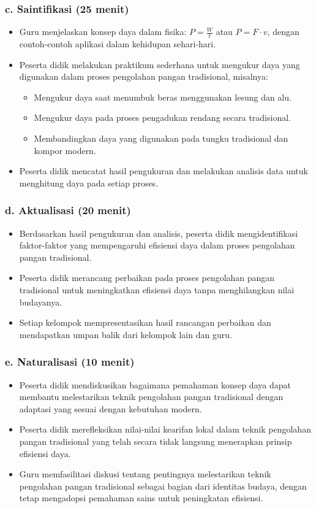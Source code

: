 \documentclass[12pt,a4paper]{article}
\begin{document}
\subsubsection*{c. Saintifikasi (25 menit)}
\begin{itemize}[leftmargin=*]
    \item Guru menjelaskan konsep daya dalam fisika: $P = \frac{W}{t}$ atau $P = F \cdot v$, dengan contoh-contoh aplikasi dalam kehidupan sehari-hari.
    \item Peserta didik melakukan praktikum sederhana untuk mengukur daya yang digunakan dalam proses pengolahan pangan tradisional, misalnya:
    \begin{itemize}
        \item Mengukur daya saat menumbuk beras menggunakan lesung dan alu.
        \item Mengukur daya pada proses pengadukan rendang secara tradisional.
        \item Membandingkan daya yang digunakan pada tungku tradisional dan kompor modern.
    \end{itemize}
    \item Peserta didik mencatat hasil pengukuran dan melakukan analisis data untuk menghitung daya pada setiap proses.
\end{itemize}

\subsubsection*{d. Aktualisasi (20 menit)}
\begin{itemize}[leftmargin=*]
    \item Berdasarkan hasil pengukuran dan analisis, peserta didik mengidentifikasi faktor-faktor yang mempengaruhi efisiensi daya dalam proses pengolahan pangan tradisional.
    \item Peserta didik merancang perbaikan pada proses pengolahan pangan tradisional untuk meningkatkan efisiensi daya tanpa menghilangkan nilai budayanya.
    \item Setiap kelompok mempresentasikan hasil rancangan perbaikan dan mendapatkan umpan balik dari kelompok lain dan guru.
\end{itemize}

\subsubsection*{e. Naturalisasi (10 menit)}
\begin{itemize}[leftmargin=*]
    \item Peserta didik mendiskusikan bagaimana pemahaman konsep daya dapat membantu melestarikan teknik pengolahan pangan tradisional dengan adaptasi yang sesuai dengan kebutuhan modern.
    \item Peserta didik merefleksikan nilai-nilai kearifan lokal dalam teknik pengolahan pangan tradisional yang telah secara tidak langsung menerapkan prinsip efisiensi daya.
    \item Guru memfasilitasi diskusi tentang pentingnya melestarikan teknik pengolahan pangan tradisional sebagai bagian dari identitas budaya, dengan tetap mengadopsi pemahaman sains untuk peningkatan efisiensi.
\end{itemize}
\end{document}
